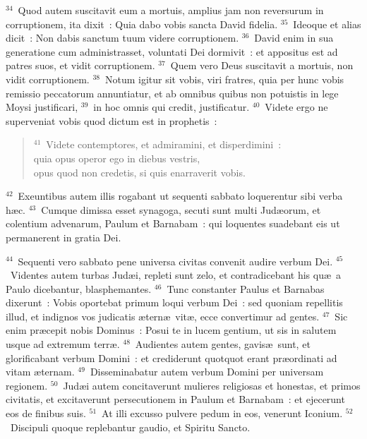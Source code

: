 ${}^{34}$~Quod autem suscitavit eum a mortuis, amplius jam non reversurum in corruptionem, ita dixit~: Quia dabo vobis sancta David fidelia.
${}^{35}$~Ideoque et alias dicit~: Non dabis sanctum tuum videre corruptionem.
${}^{36}$~David enim in sua generatione cum administrasset, voluntati Dei dormivit~: et appositus est ad patres suos, et vidit corruptionem.
${}^{37}$~Quem vero Deus suscitavit a mortuis, non vidit corruptionem.
${}^{38}$~Notum igitur sit vobis, viri fratres, quia per hunc vobis remissio peccatorum annuntiatur, et ab omnibus quibus non potuistis in lege Moysi justificari,
${}^{39}$~in hoc omnis qui credit, justificatur.
${}^{40}$~Videte ergo ne superveniat vobis quod dictum est in prophetis~:
\begin{flushleft}\begin{verse}${}^{41}$~Videte contemptores, et admiramini, et disperdimini~:\\ quia opus operor ego in diebus vestris,\\ opus quod non credetis, si quis enarraverit vobis.\end{verse}\end{flushleft}


${}^{42}$~Exeuntibus autem illis rogabant ut sequenti sabbato loquerentur sibi verba h\ae c.
${}^{43}$~Cumque dimissa esset synagoga, secuti sunt multi Jud\ae orum, et colentium advenarum, Paulum et Barnabam~: qui loquentes suadebant eis ut permanerent in gratia Dei.


${}^{44}$~Sequenti vero sabbato pene universa civitas convenit audire verbum Dei.
${}^{45}$~Videntes autem turbas Jud\ae i, repleti sunt zelo, et contradicebant his qu\ae\ a Paulo dicebantur, blasphemantes.
${}^{46}$~Tunc constanter Paulus et Barnabas dixerunt~: Vobis oportebat primum loqui verbum Dei~: sed quoniam repellitis illud, et indignos vos judicatis \ae tern\ae\ vit\ae , ecce convertimur ad gentes.
${}^{47}$~Sic enim pr\ae cepit nobis Dominus~: Posui te in lucem gentium, ut sis in salutem usque ad extremum terr\ae .
${}^{48}$~Audientes autem gentes, gavis\ae\ sunt, et glorificabant verbum Domini~: et crediderunt quotquot erant pr\ae ordinati ad vitam \ae ternam.
${}^{49}$~Disseminabatur autem verbum Domini per universam regionem.
${}^{50}$~Jud\ae i autem concitaverunt mulieres religiosas et honestas, et primos civitatis, et excitaverunt persecutionem in Paulum et Barnabam~: et ejecerunt eos de finibus suis.
${}^{51}$~At illi excusso pulvere pedum in eos, venerunt Iconium.
${}^{52}$~Discipuli quoque replebantur gaudio, et Spiritu Sancto.

